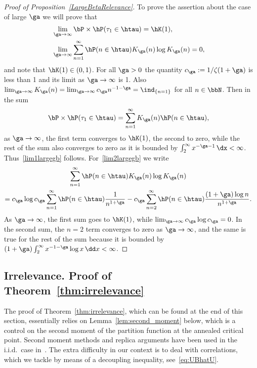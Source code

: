 \begin{proof}[Proof of Proposition~\ref{LargeBetaRelevance}]
To prove the assertion about the case of large $\ga$ we will prove that
\begin{align}
&\lim_{\ga\to\infty} \bP \times \hP(\tau_1 \in \htau) = \hK(1), \label{lim1largegb}\\
&\lim_{\ga\to\infty} \sum_{n=1}^\infty \hP(n \in \htau) K_\ga(n) \log K_\ga(n) = 0, \label{lim2largegb}
\end{align}
and note that $\hK(1) \in (0,1)$. For all $\ga > 0$ the quantity $c_\ga := 1/\zeta(1 + \ga)$ is less than 1 and its limit as $\ga \to \infty$ is 1. Also $\lim_{\ga\to\infty} K_\ga(n) = \lim_{\ga\to\infty} c_\ga n^{- 1 - \ga} = \ind_{\{n = 1\}}$ for all $n \in \bbN$. Then in the sum
\begin{equation}
\bP \times \hP(\tau_1 \in \htau) = \sum_{n=1}^\infty K_\ga(n) \hP(n \in \htau),
\end{equation}
as $\ga \to \infty$, the first term converges to $\hK(1)$, the second to zero, while the rest of the sum also converges to zero as it is bounded by $\int_2^\infty x^{- \ga -1}\,\dx < \infty$. Thus~\eqref{lim1largegb} follows. For~\eqref{lim2largegb} we write
\begin{multline}
\sum_{n=1}^\infty \hP(n \in \htau) K_\ga(n) \log K_\ga(n) \\
= c_\ga \log c_\ga \sum_{n=1}^\infty \hP(n \in \htau) \frac{1}{n^{1 + \ga}} - c_\ga \sum_{n=2}^\infty \hP(n \in \htau) \frac{(1 + \ga) \log n}{n^{1 + \ga}}.
\end{multline}
As $\ga \to \infty$, the first sum goes to $\hK(1)$, while $\lim_{\ga\to\infty} c_\ga \log c_\ga = 0$. In the second sum, the $n = 2$ term converges to zero as $\ga \to \infty$, and the same is true for the rest of the sum because it is bounded by $(1 + \ga) \int_2^\infty x^{- 1 - \ga} \log x\, \dd x < \infty$.
\end{proof}

\subsection{Irrelevance. Proof of Theorem~\ref{thm:irrelevance}}\label{sec4.3}

The proof of Theorem~\ref{thm:irrelevance}, which can be found at the end of this section, essentially relies on Lemma~\ref{lem:second_moment} below, which is a control on the second moment of the partition function at the annealed critical point. Second moment methods and replica arguments have been used in the i.i.d.~case in~\cite{T08}. The extra difficulty in our context is to deal with correlations, which we tackle by means of a decoupling inequality, see~\eqref{eq:UBhatU}.

